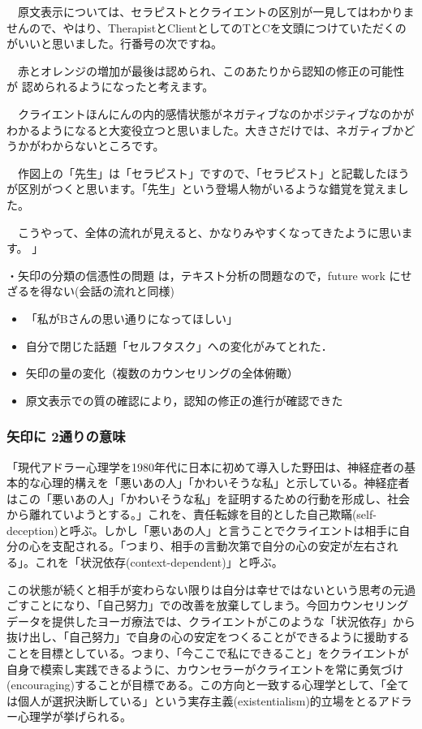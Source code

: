 \documentclass[shuuron]{kuee}
\begin{document}
　原文表示については、セラピストとクライエントの区別が一見してはわかりま
せんので、やはり、TherapistとClientとしてのTとCを文頭につけていただくの
がいいと思いました。行番号の次ですね。

　赤とオレンジの増加が最後は認められ、このあたりから認知の修正の可能性が
認められるようになったと考えます。

　クライエントほんにんの内的感情状態がネガティブなのかポジティブなのかが
わかるようになると大変役立つと思いました。大きさだけでは、ネガティブかど
うかがわからないところです。

　作図上の「先生」は「セラピスト」ですので、「セラピスト」と記載したほう
が区別がつくと思います。「先生」という登場人物がいるような錯覚を覚えまし
た。

　こうやって、全体の流れが見えると、かなりみやすくなってきたように思いま
す。
」

・矢印の分類の信憑性の問題
は，テキスト分析の問題なので，future work にせざるを得ない(会話の流れと同様)

\begin{itemize}

\item 「私がBさんの思い通りになってほしい」
\item 自分で閉じた話題「セルフタスク」への変化がみてとれた．
\item 矢印の量の変化（複数のカウンセリングの全体俯瞰）
\item 原文表示での質の確認により，認知の修正の進行が確認できた
 \end{itemize}

\subsubsection{矢印に
2通りの意味
}


 「現代アドラー心理学を1980年代に日本に初めて導入した野田\cite{zokad}は、神経症者の基本的な心理的構えを「悪いあの人」「かわいそうな私」と示している。神経症者はこの「悪いあの人」「かわいそうな私」を証明するための行動を形成し、社会から離れていようとする。」これを、責任転嫁を目的とした自己欺瞞(self-deception)と呼ぶ\cite{Darshana}。しかし「悪いあの人」と言うことでクライエントは相手に自分の心を支配される。「つまり、相手の言動次第で自分の心の安定が左右される」。これを「状況依存(context-dependent)」と呼ぶ。

 この状態が続くと相手が変わらない限りは自分は幸せではないという思考の元過ごすことになり、「自己努力」での改善を放棄してしまう。今回カウンセリングデータを提供したヨーガ療法では、クライエントがこのような「状況依存」から抜け出し、「自己努力」で自身の心の安定をつくることができるように援助することを目標としている。つまり、「今ここで私にできること」をクライエントが自身で模索し実践できるように、カウンセラーがクライエントを常に勇気づけ(encouraging)することが目標である。この方向と一致する心理学として、「全ては個人が選択決断している」という実存主義(existentialism)的立場をとるアドラー心理学が挙げられる。
\end{document}
